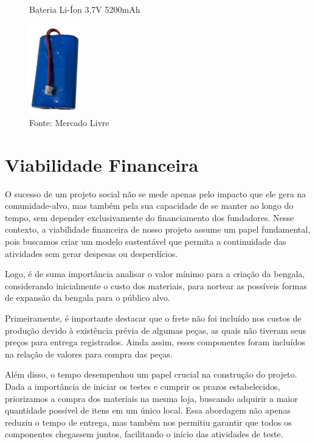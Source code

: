      \begin{figure}[h!]
        \captionsetup{width=1\textwidth}
        \caption{\label{fig:bateria}Bateria Li-Íon 3,7V 5200mAh}
        \centering
        \includegraphics[width=0.2\textwidth]{figuras/bateria} 
        \caption*{Fonte: Mercado Livre}
    \end{figure}

    \section{Viabilidade Financeira}
    O sucesso de um projeto social não se mede apenas pelo impacto que ele gera na comunidade-alvo, mas também pela sua capacidade de se manter ao longo do tempo, sem depender exclusivamente do financiamento dos fundadores. Nesse contexto, a viabilidade financeira de nosso projeto assume um papel fundamental, pois buscamos criar um modelo sustentável que permita a continuidade das atividades sem gerar despesas ou desperdícios.

    Logo, é de suma importância analisar o valor mínimo para a criação da bengala, considerando inicialmente o custo dos materiais, para nortear as possíveis formas de expansão da bengala para o público alvo.

    Primeiramente, é importante destacar que o frete não foi incluído nos custos de produção devido à existência prévia de algumas peças, as quais não tiveram seus preços para entrega registrados. Ainda assim, esses componentes foram incluídos na relação de valores para compra das peças. 

    Além disso, o tempo desempenhou um papel crucial na construção do projeto. Dada a importância de iniciar os testes e cumprir os prazos estabelecidos, priorizamos a compra dos materiais na mesma loja, buscando adquirir a maior quantidade possível de itens em um único local. Essa abordagem não apenas reduziu o tempo de entrega, mas também nos permitiu garantir que todos os componentes chegassem juntos, facilitando o início das atividades de teste.

